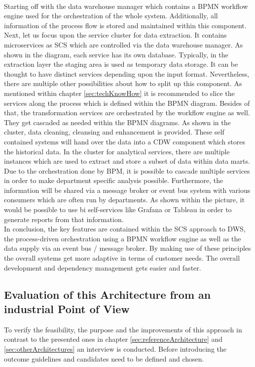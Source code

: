\\
Starting off with the data warehouse manager which contains a BPMN workflow engine used for the orchestration of the whole system. Additionally, all information of the process flow is stored and maintained within this component. \newline
Next, let us focus upon the service cluster for data extraction. It contains microservices as SCS which are controlled via the data warehouse manager. As shown in the diagram, each service has its own database. Typically, in the extraction layer the staging area is used as temporary data storage.  It can be thought to have distinct services depending upon the input format. Nevertheless, there are multiple other possibilities about how to split up this component. As mentioned within chapter \ref{sec:techKnowHow} it is recommended to slice the services along the process which is defined within the BPMN diagram.\newline
Besides of that, the transformation services are orchestrated by the workflow engine as well. They get cascaded as needed within the BPMN diagrams. As shown in the cluster, data cleaning, cleansing and enhancement is provided. These self contained systems will hand over the data into a CDW component which stores the historical data.\newline
In the cluster for analytical services, there are multiple instances which are used to extract and store a subset of data within data marts. Due to the orchestration done by BPM, it is possible to cascade multiple services in order to make department specific analysis possible. Furthermore, the information will be shared via a message broker or event bus system with various consumers which are often run by departments. As shown within the picture, it would be possible to use \acrshort{bi} self-services like Grafana or Tableau in order to generate reports from that information.\newline
\\
In conclusion, the key features are contained within the SCS approach to DWS, the process-driven orchestration using a BPMN workflow engine as well as the data supply via an event bus / message broker. By making use of these principles the overall systems get more adaptive in terms of customer needs. The overall development and dependency management gets easier and faster. 

\subsection{Evaluation of this Architecture from an industrial Point of View}
To verify the feasibility, the purpose and the improvements of this approach in contrast to the presented ones in chapter \ref{sec:referenceArchitecture} and \ref{sec:otherArchitectures} an interview is conducted. Before introducing the outcome guidelines and candidates need to be defined and chosen.

